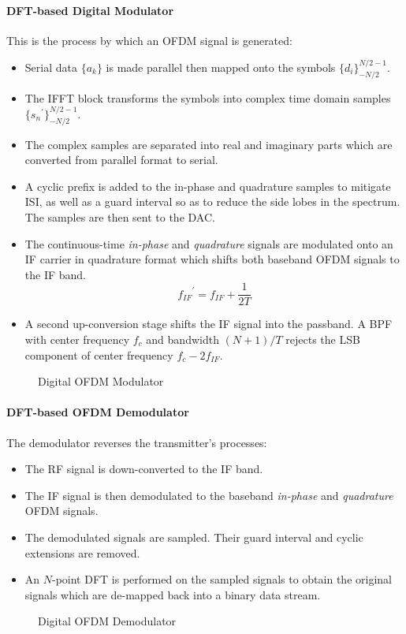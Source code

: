 \paragraph{DFT-based Digital Modulator} This is the process by which an OFDM signal is generated:
\begin{itemize}
	\item Serial data \(\{a_k\}\) is made parallel then mapped onto the symbols \(\{d_i\}_{-N/2}^{N/2-1}\).
	\item The \gls{IFFT} block transforms the symbols into complex time domain samples \(\{{s_n}^\prime\}_{-N/2}^{N/2-1}\).
	\item The complex samples are separated into real and imaginary parts which are converted from parallel format to serial.
	\item A cyclic prefix is added to the in-phase and quadrature samples to mitigate \gls{ISI}, as well as a guard interval so as to reduce the side lobes in the spectrum. The samples are then sent to the \gls{DAC}.
	\item The continuous-time \emph{in-phase} and \emph{quadrature} signals are modulated onto an \gls{IF} carrier in quadrature format which shifts both baseband \gls{OFDM} signals to the \gls{IF} band.
		\[
			{f_{IF}}^\prime = f_{IF} + \frac{1}{2T}
		\]
		\begin{mathDef}
		\end{mathDef}
	\item A second up-conversion stage shifts the \gls{IF} signal into the passband. A \gls{BPF} with center frequency \(f_c\) and bandwidth \((N+1)/T\) rejects the \gls{LSB} component of center frequency \(f_c - 2f_{IF}\).
\end{itemize}
\begin{figure}[!h]
	\centering
	\resizebox{\textwidth}{!}{
		
	}
	\caption{Digital OFDM Modulator}
\end{figure}
\paragraph{DFT-based OFDM Demodulator} The demodulator reverses the transmitter's processes:
\begin{itemize}
	\item The \gls{RF} signal is down-converted to the \gls{IF} band.
	\item The \gls{IF} signal is then demodulated to the baseband \emph{in-phase} and \emph{quadrature} \gls{OFDM} signals.
	\item The demodulated signals are sampled. Their guard interval and cyclic extensions are removed.
	\item An \(N\)-point \gls{DFT} is performed on the sampled signals to obtain the original signals which are de-mapped back into a binary data stream.
\end{itemize}
\begin{figure}[!ht]
	\centering
	\resizebox{\textwidth}{!}{
		
	}
	\caption{Digital OFDM Demodulator}
\end{figure}

